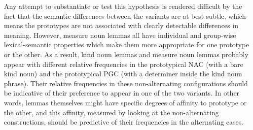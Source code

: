 \documentclass[USenglish]{article}
\begin{document}
Any attempt to substantiate or test this hypothesis is rendered difficult by the fact that the semantic differences between the variants are at best subtle, which means the prototypes are not associated with clearly detectable differences in meaning.
However, measure noun lemmas all have individual and group-wise lexical-semantic properties which make them more appropriate for one prototype or the other.
As a result, kind noun lemmas and measure noun lemmas probably appear with different relative frequencies in the prototypical NAC (with a bare kind noun) and the prototypical PGC (with a determiner inside the kind noun phrase).
Their relative frequencies in these non-alternating configurations should be indicative of their preference to appear in one of the two variants.
In other words, lemmas themselves might have specific degrees of affinity to prototype or the other, and this affinity, measured by looking at the non-alternating constructions, should be predictive of their frequencies in the alternating cases.

%
\end{document}
